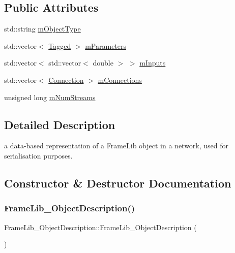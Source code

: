 \subsection*{Public Attributes}
\begin{DoxyCompactItemize}
\item 
std\+::string \hyperlink{struct_frame_lib___object_description_aa3a4437f51fa6f84202e41d0d363b844}{m\+Object\+Type}
\item 
std\+::vector$<$ \hyperlink{struct_frame_lib___object_description_1_1_tagged}{Tagged} $>$ \hyperlink{struct_frame_lib___object_description_a45297bfeb12aa74520edaddfd03fc12c}{m\+Parameters}
\item 
std\+::vector$<$ std\+::vector$<$ double $>$ $>$ \hyperlink{struct_frame_lib___object_description_a536003edf9fa0cf89df7fd95b73d79f5}{m\+Inputs}
\item 
std\+::vector$<$ \hyperlink{struct_frame_lib___object_description_1_1_connection}{Connection} $>$ \hyperlink{struct_frame_lib___object_description_a10df93df1ad0f5c75d333434947790c5}{m\+Connections}
\item 
unsigned long \hyperlink{struct_frame_lib___object_description_a7323ef1dbe80f28d68acdb1aafdc6fe6}{m\+Num\+Streams}
\end{DoxyCompactItemize}


\subsection{Detailed Description}
a data-\/based representation of a Frame\+Lib object in a network, used for serialisation purposes. 

\subsection{Constructor \& Destructor Documentation}
\mbox{\label{struct_frame_lib___object_description_a1e5fcc8625dc93572b5adc9f52ec568e}} 
\subsubsection{\texorpdfstring{Frame\+Lib\+\_\+\+Object\+Description()}{FrameLib\_ObjectDescription()}}
{\footnotesize\ttfamily Frame\+Lib\+\_\+\+Object\+Description\+::\+Frame\+Lib\+\_\+\+Object\+Description (\begin{DoxyParamCaption}{ }\end{DoxyParamCaption})\hspace{0.3cm}{\ttfamily [inline]}}



